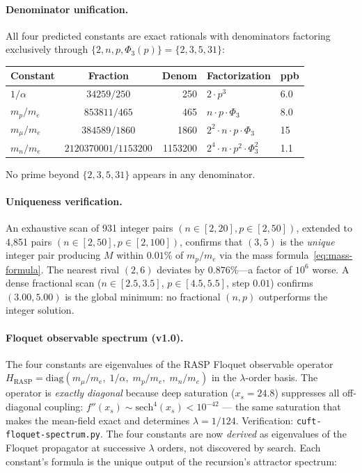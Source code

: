 \documentclass[12pt,a4paper]{article}
\theoremstyle{definition}
\newcommand{\Phithree}{\Phi_3}
\begin{document}
\paragraph{Denominator unification.}
All four predicted constants are exact rationals with denominators
factoring exclusively through $\{2, n, p, \Phithree(p)\} = \{2, 3, 5, 31\}$:

\begin{center}
\begin{tabular}{lcrll}
\toprule
Constant & Fraction & Denom & Factorization & ppb \\
\midrule
$1/\alpha$  & $34259/250$          &     250 & $2 \cdot p^3$ & 6.0 \\
$m_p/m_e$   & $853811/465$         &     465 & $n \cdot p \cdot \Phithree$ & 8.0 \\
$m_\mu/m_e$ & $384589/1860$        &    1860 & $2^2 \cdot n \cdot p \cdot \Phithree$ & 15 \\
$m_n/m_e$   & $2120370001/1153200$ & 1153200 & $2^4 \cdot n \cdot p^2 \cdot \Phithree^2$ & 1.1 \\
\bottomrule
\end{tabular}
\end{center}

No prime beyond $\{2, 3, 5, 31\}$ appears in any denominator.

\paragraph{Uniqueness verification.}
An exhaustive scan of 931 integer pairs $(n \in [2,20], p \in [2,50])$,
extended to 4,851 pairs $(n \in [2,50], p \in [2,100])$, confirms that
$(3,5)$ is the \emph{unique} integer pair producing $M$ within $0.01\%$
of $m_p/m_e$ via the mass formula~\eqref{eq:mass-formula}. The nearest rival
$(2,6)$ deviates by $0.876\%$---a factor of $10^6$ worse. A dense
fractional scan ($n \in [2.5,3.5]$, $p \in [4.5,5.5]$, step $0.01$)
confirms $(3.00, 5.00)$ is the global minimum: no fractional $(n,p)$
outperforms the integer solution.

\paragraph{Floquet observable spectrum (v1.0).}
The four constants are eigenvalues of the RASP Floquet observable operator
$H_\mathrm{RASP} = \mathrm{diag}(m_\mu/m_e,\; 1/\alpha,\; m_p/m_e,\; m_n/m_e)$
in the $\lambda$-order basis. The operator is \emph{exactly diagonal}
because deep saturation ($x_s = 24.8$) suppresses all off-diagonal coupling:
$f''(x_s) \sim \mathrm{sech}^4(x_s) < 10^{-42}$ --- the same saturation that
makes the mean-field exact and determines $\lambda = 1/124$.
Verification: \texttt{cuft-floquet-spectrum.py}.
The four constants are now \emph{derived} as eigenvalues of the Floquet
propagator at successive $\lambda$ orders, not discovered by search.
Each constant's formula is the unique output of the recursion's attractor
spectrum:
\end{document}
